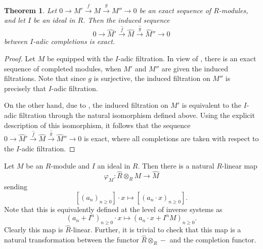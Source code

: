 \documentclass[11pt]{article}
\theoremstyle{thmstyle}
\newtheorem{theorem}{Theorem}[section]
\theoremstyle{defstyle}
\newcommand{\wh}[1]{\widehat{#1}}
\renewcommand{\ge}{\geqslant}
\begin{document}
\begin{theorem}
    Let $0\to M'\xrightarrow{f} M\xrightarrow{g} M''\to 0$ be an exact sequence of $R$-modules, and let $I$ be an ideal in $R$. Then the induced sequence 
    \begin{equation*}
        0\to \wh M'\xrightarrow{\wh f}\wh M\xrightarrow{\wh g}\wh M''\to 0
    \end{equation*}
    between $I$-adic completions is exact.
\end{theorem}
\begin{proof}
    Let $M$ be equipped with the $I$-adic filtration. In view of , there is an exact sequence of completed modules, when $M'$ and $M''$ are given the induced filtrations. Note that since $g$ is surjective, the induced filtration on $M''$ is precisely that $I$-adic filtration.

    On the other hand, due to , the induced filtration on $M'$ is equivalent to the $I$-adic filtration through the natural isomorphism defined above. Using the explicit description of this isomorphism, it follows that the sequence $0\to\wh M'\xrightarrow{\wh f}\wh M\xrightarrow{\wh g}\wh M''\to 0$ is exact, where all completions are taken with respect to the $I$-adic filtration.
\end{proof}

Let $M$ be an $R$-module and $I$ an ideal in $R$. Then there is a natural $R$-linear map 
\begin{equation*}
    \varphi_M\colon\wh R\otimes_R M\to\wh M
\end{equation*}
sending 
\begin{equation*}
    \left[(a_n)_{n\ge 0}\right]\cdot x\longmapsto \left[(a_n\cdot x)_{n\ge 0}\right].
\end{equation*}
Note that this is equivalently defined at the level of inverse systems as 
\begin{equation*}
    \left(a_n + I^n\right)_{n\ge0}\cdot x\longmapsto\left(a_n\cdot x + I^n M\right)_{n\ge 0}.
\end{equation*}
Clearly this map is $\wh R$-linear. Further, it is trivial to check that this map is a natural transformation between the functor $\wh R\otimes_R -$ and the completion functor.
\end{document}
